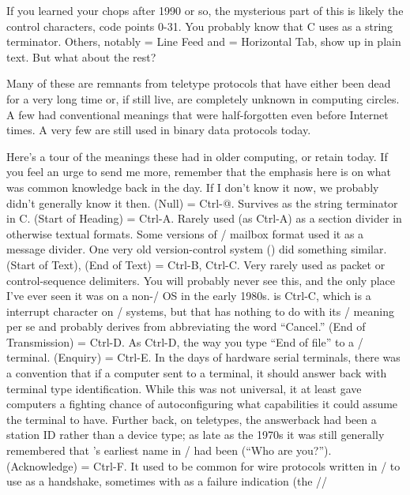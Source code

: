 If you learned your chops after 1990 or so, the mysterious part of this is
likely the control characters, code points 0-31. You probably know that C uses
 as a string terminator. Others, notably  = Line Feed and  = Horizontal
Tab, show up in plain text. But what about the rest?

Many of these are remnants from teletype protocols that have either been dead
for a very long time or, if still live, are completely unknown in computing
circles. A few had conventional meanings that were half-forgotten even before
Internet times. A very few are still used in binary data protocols today.

Here's a tour of the meanings these had in older computing, or retain today. If
you feel an urge to send me more, remember that the emphasis here is on what
was common knowledge back in the day. If I don't know it now, we probably
didn't generally know it then.
\medbreak
\dlist {} (Null) = Ctrl-@. Survives as the string terminator in C.
\dlist {} (Start of Heading) = Ctrl-A. Rarely used (as Ctrl-A) as a section
divider in otherwise textual formats. Some versions of \UNIX/ mailbox format used
it as a message divider. One very old version-control system () did
something similar.
\dlist {} (Start of Text),  (End of Text) = Ctrl-B, Ctrl-C. Very rarely
used as packet or control-sequence delimiters. You will probably never see
this, and the only place I've ever seen it was on a non-\UNIX/ OS in the early
1980s.  is Ctrl-C, which is a  interrupt character on \UNIX/ systems,
but that has nothing to do with its \ASCII/ meaning per se and probably derives
from abbreviating the word ``Cancel.''
\dlist {} (End of Transmission) = Ctrl-D. As Ctrl-D, the way you type ``End of
file'' to a \UNIX/ terminal.
\dlist {} (Enquiry) = Ctrl-E. In the days of hardware serial terminals, there
was a convention that if a computer sent  to a terminal, it should answer
back with terminal type identification. While this was not universal, it at
least gave computers a fighting chance of autoconfiguring what capabilities it
could assume the terminal to have. Further back, on teletypes, the answerback
had been a station ID rather than a device type; as late as the 1970s it was
still generally remembered that 's earliest name in \ASCII/ had been  (``Who
are you?'').
\dlist {} (Acknowledge) = Ctrl-F.
It used to be common for wire protocols written in \ASCII/ to use  as a
handshake, sometimes with  as a failure indication (the //
